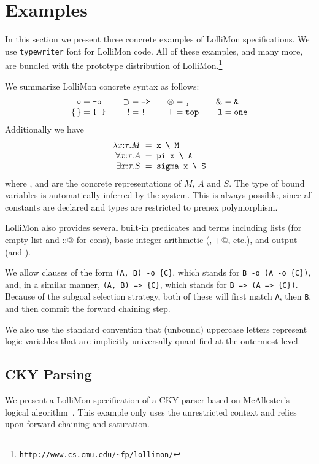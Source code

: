 \documentclass{sig-alt}
\begin{document}
\section{Examples}
\label{sec:examples}
In this section we present three concrete examples of LolliMon
specifications.  We use \texttt{typewriter} font for LolliMon code.
All of these examples, and many more, are bundled with the prototype
distribution of LolliMon.\footnote{\texttt{http://www.cs.cmu.edu/\~{}fp/lollimon/}}

We summarize LolliMon concrete syntax as follows:
$$
\begin{array}{r@{{}={}}l@{\qquad}r@{{}={}}l@{\qquad}r@{{}={}}l@{\qquad}r@{{}={}}l}
\limp & \verb@-o@
&
\iimp & \verb@=>@
&
\tensor & \verb@,@
&
\with & \verb@&@
\\
\{\, \} & \verb@{ }@
&
\bang & \verb@!@
&
\top & \verb@top@
&
\one & \verb@one@
\end{array}
$$ 
Additionally we have
$$
\begin{array}{r@{\;\;=\;\;}l}
\lambda x{:}\tau.M
&
\verb@x \ M@
\\
\forall x{:}\tau.A
&
\verb@pi x \ A@
\\
\exists x{:}\tau.S
&
\verb@sigma x \ S@
\end{array}
$$ 
where \verb@M@, \verb@A@ and \verb@S@ are the concrete representations
of $M$, $A$ and $S$. The type of bound variables \verb@x@ is
automatically inferred by the system. This is always possible, since
all constants are declared and types are restricted to prenex
polymorphism.  

LolliMon also provides several built-in predicates and terms including
lists (\verb@nil@  for empty list and \verb@::@ for cons),
basic integer arithmetic (\verb@is@, \verb@+@, etc.),
and output (\verb@write@ and \verb@nl@).

We allow clauses of the form \verb"(A, B) -o {C}", which stands
for \verb"B -o (A -o {C})", and, in a similar manner,
\verb"(A, B) => {C}", which stands for \verb"B => (A => {C})".
Because of the subgoal selection strategy,
both of these will first match \verb"A", then \verb"B", and
then commit the forward chaining step.

We also use the standard convention that (unbound) uppercase letters
represent logic variables that are implicitly universally quantified
at the outermost level.

\subsection{CKY Parsing}
\label{ssec:cky}
We present a LolliMon specification of a CKY parser based on
McAllester's logical algorithm~\cite{Mcallester02jacm}.
This example only uses the
unrestricted context and relies upon forward chaining and saturation.
\end{document}
